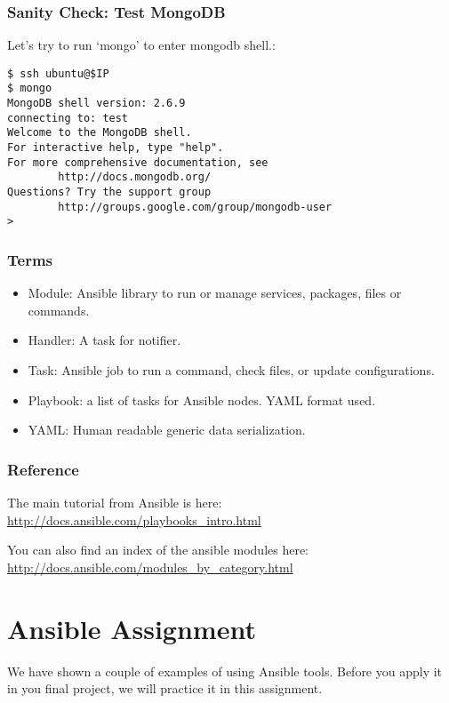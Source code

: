 \subsubsection{Sanity Check: Test
MongoDB}\label{sanity-check-test-mongodb}

Let's try to run `mongo' to enter mongodb shell.:

\begin{verbatim}
$ ssh ubuntu@$IP
$ mongo
MongoDB shell version: 2.6.9
connecting to: test
Welcome to the MongoDB shell.
For interactive help, type "help".
For more comprehensive documentation, see
        http://docs.mongodb.org/
Questions? Try the support group
        http://groups.google.com/group/mongodb-user
> 
\end{verbatim}

\subsubsection{Terms}\label{terms}

\begin{itemize}
\tightlist
\item
  Module: Ansible library to run or manage services, packages, files or
  commands.
\item
  Handler: A task for notifier.
\item
  Task: Ansible job to run a command, check files, or update
  configurations.
\item
  Playbook: a list of tasks for Ansible nodes. YAML format used.
\item
  YAML: Human readable generic data serialization.
\end{itemize}

\subsubsection{Reference}\label{reference}

The main tutorial from Ansible is here:
\url{http://docs.ansible.com/playbooks_intro.html}

You can also find an index of the ansible modules here:
\url{http://docs.ansible.com/modules_by_category.html}
\section{Ansible Assignment}\label{ansible-assignment}

We have shown a couple of examples of using Ansible tools. Before you
apply it in you final project, we will practice it in this assignment.

